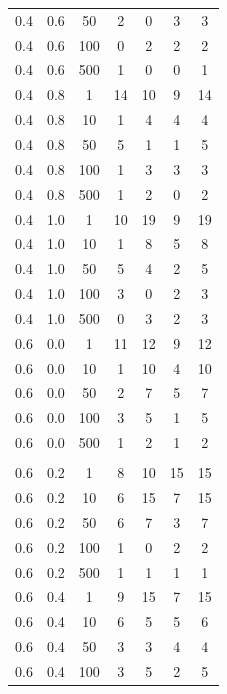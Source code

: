 \begin{longtable}{|c|c|c|c|c|c|c|}
	0.4 &  0.6 &   50 &     2 &     0 &     3 &     3 \\
	0.4 &  0.6 &  100 &     0 &     2 &     2 &     2 \\
	0.4 &  0.6 &  500 &     1 &     0 &     0 &     1 \\ \hline
	0.4 &  0.8 &    1 &    14 &    10 &     9 &    14 \\
	0.4 &  0.8 &   10 &     1 &     4 &     4 &     4 \\
	0.4 &  0.8 &   50 &     5 &     1 &     1 &     5 \\
	0.4 &  0.8 &  100 &     1 &     3 &     3 &     3 \\
	0.4 &  0.8 &  500 &     1 &     2 &     0 &     2 \\ \hline
	0.4 &  1.0 &    1 &    10 &    19 &     9 &    19 \\
	0.4 &  1.0 &   10 &     1 &     8 &     5 &     8 \\
	0.4 &  1.0 &   50 &     5 &     4 &     2 &     5 \\
	0.4 &  1.0 &  100 &     3 &     0 &     2 &     3 \\
	0.4 &  1.0 &  500 &     0 &     3 &     2 &     3 \\ \hline
	0.6 &  0.0 &    1 &    11 &    12 &     9 &    12 \\
	0.6 &  0.0 &   10 &     1 &    10 &     4 &    10 \\
	0.6 &  0.0 &   50 &     2 &     7 &     5 &     7 \\
	0.6 &  0.0 &  100 &     3 &     5 &     1 &     5 \\
	0.6 &  0.0 &  500 &     1 &     2 &     1 &     2 \\
	\hline
	\pagebreak
	\multicolumn{7}{l}{\textit{Продолжение таблицы}}\\
	\hline
	0.6 &  0.2 &    1 &     8 &    10 &    15 &    15 \\
	0.6 &  0.2 &   10 &     6 &    15 &     7 &    15 \\
	0.6 &  0.2 &   50 &     6 &     7 &     3 &     7 \\
	0.6 &  0.2 &  100 &     1 &     0 &     2 &     2 \\
	0.6 &  0.2 &  500 &     1 &     1 &     1 &     1 \\ \hline
	0.6 &  0.4 &    1 &     9 &    15 &     7 &    15 \\
	0.6 &  0.4 &   10 &     6 &     5 &     5 &     6 \\
	0.6 &  0.4 &   50 &     3 &     3 &     4 &     4 \\
	0.6 &  0.4 &  100 &     3 &     5 &     2 &     5 \\

\end{longtable}
